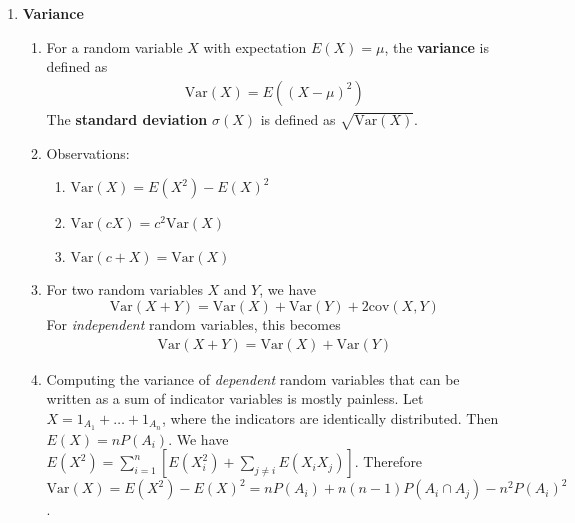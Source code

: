 \documentclass[10pt]{article}
\begin{document}
\begin{multicols}{2}
\begin{enumerate}
        \item \textbf{Variance} 
        \begin{enumerate}
            \item For a random variable $X$ with expectation $E(X)=\mu$, the \textbf{variance} is defined as
            \begin{align*}
                \text{Var}(X)=E\left( (X-\mu)^2\right)
            \end{align*}
            The \textbf{standard deviation} $\sigma(X)$ is defined as $\sqrt{\text{Var}(X)}$.
            \item Observations:
            \begin{enumerate}
                \item $\text{Var}(X)=E(X^2) - E(X)^2$
                \item $\text{Var}(cX)=c^2\text{Var}(X)$
                \item $\text{Var}(c+X)=\text{Var}(X)$
            \end{enumerate}
            \item For two random variables $X$ and $Y$, we have
            $$
                \text{Var}(X+Y)=\text{Var}(X)+\text{Var}(Y)+2\text{cov}(X,Y)
            $$
            For \textit{independent} random variables, this becomes
            \begin{align*}
                \text{Var}(X+Y)=\text{Var}(X) + \text{Var}(Y)
            \end{align*}
            \item Computing the variance of \textit{dependent} random variables that can be written as a sum of indicator variables is mostly painless. Let $X=1_{A_1}+\ldots+1_{A_n}$, where the indicators are identically distributed. Then $E(X)=nP(A_i)$. We have $E(X^2)=\sum_{i=1}^{n} [E(X_i^2)+\sum_{j \neq i} E(X_iX_j)]$. Therefore $\text{Var}(X)=E(X^2)-E(X)^2=nP(A_i)+n(n-1)P(A_i \cap A_j)-n^2P(A_i)^2$.
        \end{enumerate}
        

\end{enumerate}
\end{multicols}
\end{document}
